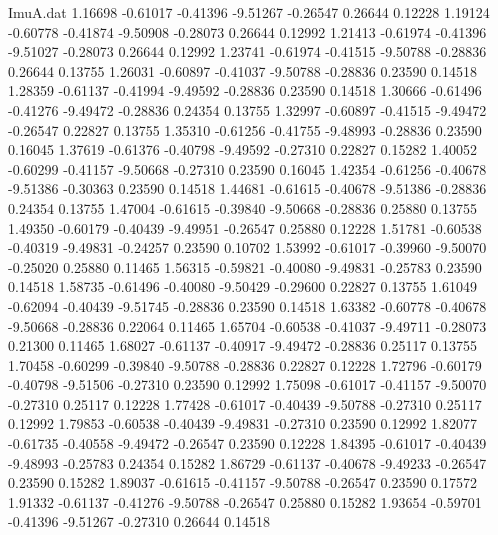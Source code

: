 \begin{filecontents}{ImuA.dat}
   1.16698   -0.61017   -0.41396   -9.51267   -0.26547    0.26644    0.12228
   1.19124   -0.60778   -0.41874   -9.50908   -0.28073    0.26644    0.12992
   1.21413   -0.61974   -0.41396   -9.51027   -0.28073    0.26644    0.12992
   1.23741   -0.61974   -0.41515   -9.50788   -0.28836    0.26644    0.13755
   1.26031   -0.60897   -0.41037   -9.50788   -0.28836    0.23590    0.14518
   1.28359   -0.61137   -0.41994   -9.49592   -0.28836    0.23590    0.14518
   1.30666   -0.61496   -0.41276   -9.49472   -0.28836    0.24354    0.13755
   1.32997   -0.60897   -0.41515   -9.49472   -0.26547    0.22827    0.13755
   1.35310   -0.61256   -0.41755   -9.48993   -0.28836    0.23590    0.16045
   1.37619   -0.61376   -0.40798   -9.49592   -0.27310    0.22827    0.15282
   1.40052   -0.60299   -0.41157   -9.50668   -0.27310    0.23590    0.16045
   1.42354   -0.61256   -0.40678   -9.51386   -0.30363    0.23590    0.14518
   1.44681   -0.61615   -0.40678   -9.51386   -0.28836    0.24354    0.13755
   1.47004   -0.61615   -0.39840   -9.50668   -0.28836    0.25880    0.13755
   1.49350   -0.60179   -0.40439   -9.49951   -0.26547    0.25880    0.12228
   1.51781   -0.60538   -0.40319   -9.49831   -0.24257    0.23590    0.10702
   1.53992   -0.61017   -0.39960   -9.50070   -0.25020    0.25880    0.11465
   1.56315   -0.59821   -0.40080   -9.49831   -0.25783    0.23590    0.14518
   1.58735   -0.61496   -0.40080   -9.50429   -0.29600    0.22827    0.13755
   1.61049   -0.62094   -0.40439   -9.51745   -0.28836    0.23590    0.14518
   1.63382   -0.60778   -0.40678   -9.50668   -0.28836    0.22064    0.11465
   1.65704   -0.60538   -0.41037   -9.49711   -0.28073    0.21300    0.11465
   1.68027   -0.61137   -0.40917   -9.49472   -0.28836    0.25117    0.13755
   1.70458   -0.60299   -0.39840   -9.50788   -0.28836    0.22827    0.12228
   1.72796   -0.60179   -0.40798   -9.51506   -0.27310    0.23590    0.12992
   1.75098   -0.61017   -0.41157   -9.50070   -0.27310    0.25117    0.12228
   1.77428   -0.61017   -0.40439   -9.50788   -0.27310    0.25117    0.12992
   1.79853   -0.60538   -0.40439   -9.49831   -0.27310    0.23590    0.12992
   1.82077   -0.61735   -0.40558   -9.49472   -0.26547    0.23590    0.12228
   1.84395   -0.61017   -0.40439   -9.48993   -0.25783    0.24354    0.15282
   1.86729   -0.61137   -0.40678   -9.49233   -0.26547    0.23590    0.15282
   1.89037   -0.61615   -0.41157   -9.50788   -0.26547    0.23590    0.17572
   1.91332   -0.61137   -0.41276   -9.50788   -0.26547    0.25880    0.15282
   1.93654   -0.59701   -0.41396   -9.51267   -0.27310    0.26644    0.14518

\end{filecontents}
